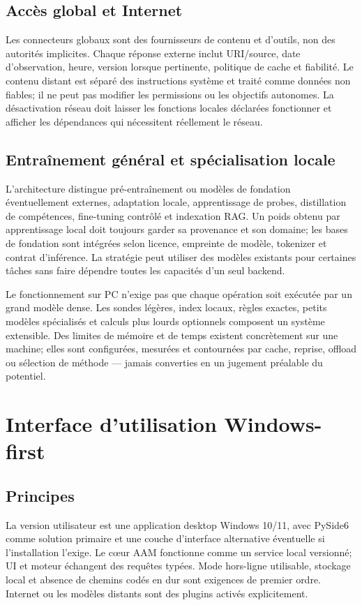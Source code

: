 \documentclass[11pt,a4paper]{report}
\begin{document}
\section{Accès global et Internet}
Les connecteurs globaux sont des fournisseurs de contenu et d'outils, non des autorités implicites. Chaque réponse externe inclut URI/source, date d'observation, heure, version lorsque pertinente, politique de cache et fiabilité. Le contenu distant est séparé des instructions système et traité comme données non fiables; il ne peut pas modifier les permissions ou les objectifs autonomes. La désactivation réseau doit laisser les fonctions locales déclarées fonctionner et afficher les dépendances qui nécessitent réellement le réseau.

\section{Entraînement général et spécialisation locale}
L'architecture distingue pré-entraînement ou modèles de fondation éventuellement externes, adaptation locale, apprentissage de probes, distillation de compétences, fine-tuning contrôlé et indexation RAG. Un poids obtenu par apprentissage local doit toujours garder sa provenance et son domaine; les bases de fondation sont intégrées selon licence, empreinte de modèle, tokenizer et contrat d'inférence. La stratégie peut utiliser des modèles existants pour certaines tâches sans faire dépendre toutes les capacités d'un seul backend.

Le fonctionnement sur PC n'exige pas que chaque opération soit exécutée par un grand modèle dense. Les sondes légères, index locaux, règles exactes, petits modèles spécialisés et calculs plus lourds optionnels composent un système extensible. Des limites de mémoire et de temps existent concrètement sur une machine; elles sont configurées, mesurées et contournées par cache, reprise, offload ou sélection de méthode — jamais converties en un jugement préalable du potentiel.

\chapter{Interface d'utilisation Windows-first}
\section{Principes}
La version utilisateur est une application desktop Windows 10/11, avec PySide6 comme solution primaire et une couche d'interface alternative éventuelle si l'installation l'exige. Le cœur AAM fonctionne comme un service local versionné; UI et moteur échangent des requêtes typées. Mode hors-ligne utilisable, stockage local et absence de chemins codés en dur sont exigences de premier ordre. Internet ou les modèles distants sont des plugins activés explicitement.
\end{document}
